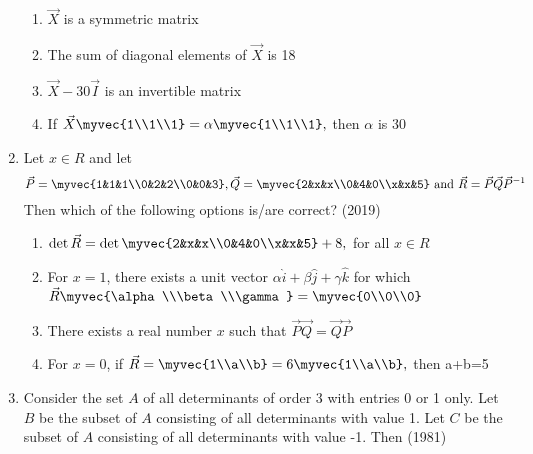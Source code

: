 \begin{enumerate}
\begin{enumerate}
	\item $\vec{X}$ is a symmetric matrix
	\item The sum of diagonal elements of $\vec{X}$ is 18
	\item $\vec{X}-30\vec{I}$ is an invertible matrix
	\item If $\vec{X}\myvec{1\\1\\1}=\alpha\myvec{1\\1\\1},$ then $\alpha$ is 30
\end{enumerate}
%
\item Let $x\in R$ and let
$$\vec{P} = \myvec{1&1&1\\0&2&2\\0&0&3},\vec{Q} = \myvec{2&x&x\\0&4&0\\x&x&5} \text{ and }\vec{R}=\vec{P}\vec{Q}\vec{P}^{-1}$$
Then which of the following options is/are correct? \hfill (2019)
%
\begin{enumerate}
\item $\det \vec{R} = \det\myvec{2&x&x\\0&4&0\\x&x&5}+8,$ for all $x\in R$
\item For $x=1$, there exists a unit vector $\alpha\hat{i}+\beta\hat{j}+\gamma\hat{k}$ for which $\vec{R}\myvec{\alpha\\\beta\\\gamma}=\myvec{0\\0\\0}$
		\item There exists a real number $x$ such that $\vec{P}\vec{Q} = \vec{Q}\vec{P}$
		\item For $x=0$, if $\vec{R}=\myvec{1\\a\\b}=6\myvec{1\\a\\b},$ then a+b=5\\[2pt]
\end{enumerate}
	\item Consider the set ${A}$ of all determinants of order 3 with entries
		0 or 1 only. Let ${B}$ be the subset of ${A}$ consisting of all
		determinants with value 1. Let $C$ be the subset of ${A}$ consisting
		of all determinants with value -1. Then
		\hfill (1981)
		\begin{multicols}{2}
			\begin{enumerate}

\end{enumerate}
\end{multicols}
\end{enumerate}
